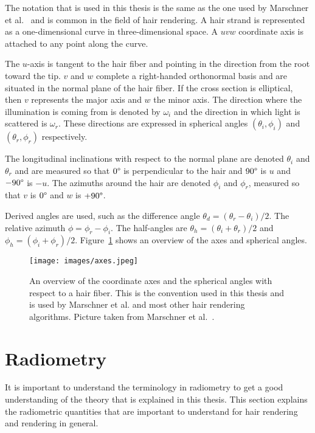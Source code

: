 \documentclass[11pt,a4paper]{report}
\begin{document}
The notation that is used in this thesis is the same as the one used by Marschner et al.~\cite{marschner} and is common in the field of hair rendering. A hair strand is represented as a one-dimensional curve in three-dimensional space. A $uvw$ coordinate axis is attached to any point along the curve.

The $u$-axis is tangent to the hair fiber and pointing in the direction from the root toward the tip. $v$ and $w$ complete a right-handed orthonormal basis and are situated in the normal plane of the hair fiber. If the cross section is elliptical, then  $v$ represents the major axis and $w$ the minor axis. The direction where the illumination is coming from is denoted by $\omega_i$ and the direction in which light is scattered is $\omega_r$. These directions are expressed in spherical angles $(\theta_i, \phi_i)$ and $(\theta_r,\phi_r)$ respectively.

The longitudinal inclinations with respect to the normal plane are denoted $\theta_i$ and $\theta_r$ and are measured so that $0\degree$ is perpendicular to the hair and $90\degree$ is $u$ and $-90\degree$ is $-u$. The azimuths around the hair are denoted $\phi_i$ and $\phi_r$, measured so that $v$ is $0\degree$ and $w$ is $+90\degree$.

Derived angles are used, such as the difference angle $\theta_d = (\theta_r - \theta_i)/2$. The relative azimuth $\phi = \phi_r - \phi_i$. The half-angles are $\theta_h = (\theta_i + \theta_r)/2$ and $\phi_h = (\phi_i + \phi_r)/2$. Figure~\ref{axis_overview} shows an overview of the axes and spherical angles.

\begin{center}
\begin{figure}

\texttt{[image: images/axes.jpeg]}

\caption{An overview of the coordinate axes and the spherical angles with respect to a hair fiber. This is the convention used in this thesis and is used by Marschner et al. and most other hair rendering algorithms. Picture taken from Marschner et al.~\cite{marschner}.}
\label{axis_overview}

\end{figure}
\end{center}

\section{Radiometry}
It is important to understand the terminology in radiometry to get a good understanding of the theory that is explained in this thesis. This section explains the radiometric quantities that are important to understand for hair rendering and rendering in general.
\end{document}
